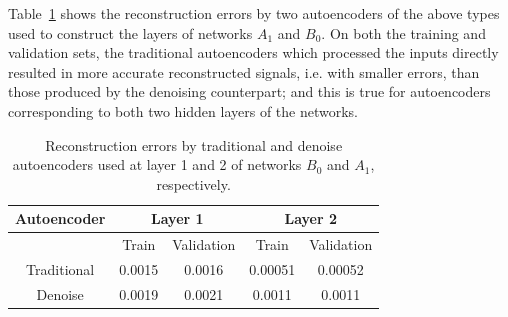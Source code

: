 \documentclass[12pt]{article}
\begin{document}
Table~\ref{tab:reconstruction_errors} shows the reconstruction errors by two autoencoders of the above types used to construct the layers of networks $A_1$ and $B_0$. On both the training and validation sets, the traditional autoencoders which processed the inputs directly resulted in more accurate reconstructed signals, i.e. with smaller errors, than those produced by the denoising counterpart; and this is true for autoencoders corresponding to both two hidden layers of the networks.

\begin{table}[!htbp]
\centering
\begin{tabular}{*5c}
\toprule
Autoencoder &  \multicolumn{2}{c}{Layer 1} & \multicolumn{2}{c}{Layer 2}\\
\midrule
{}         & Train   & Validation    & Train   & Validation\\
Traditional   & 0.0015  & 0.0016   & 0.00051  & 0.00052\\
Denoise    &  0.0019  &  0.0021   & 0.0011  & 0.0011\\
\bottomrule
\end{tabular}
\caption{Reconstruction errors by traditional and denoise autoencoders used at layer 1 and 2 of networks $B_0$ and $A_1$, respectively.}
\label{tab:reconstruction_errors}
\end{table}
\end{document}
